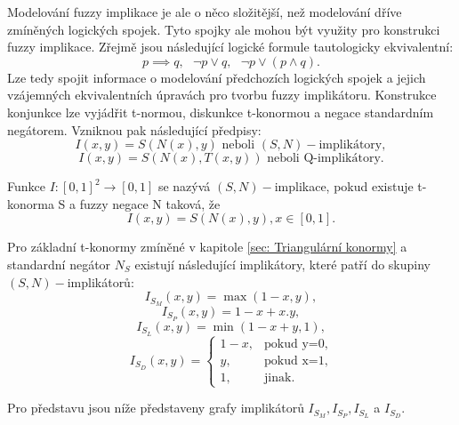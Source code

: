Modelov\'an\'i fuzzy implikace je ale o něco složitější, než modelov\'an\'i dříve zmíněných logických spojek. Tyto spojky ale mohou být využity pro konstrukci fuzzy implikace. Zřejmě jsou následující logické formule tautologicky ekvivalentní: $$ p\implies q, \mbox{   } \neg p \vee q, \mbox{   } \neg p\vee (p\wedge q) .$$ Lze tedy spojit informace o modelov\'an\'i p\v redchozích logických spojek a jejich vzájemných ekvivalentních \' upravách pro tvorbu fuzzy implikátoru. Konstrukce konjunkce lze vyjádřit t-normou, diskunkce t-konormou a negace standardn\'im negátorem. Vzniknou pak n\'asleduj\'ic\'i p\v redpisy:
$$I(x,y)=S(N(x),y)\text{ neboli $(S,N)-$implikátory},$$
$$I(x,y)=S(N(x),T(x,y)) \text{ neboli Q-implikátory}.$$

\begin{definition}
    \cite{Springer}
    Funkce $I: [0,1]^2 \rightarrow [0,1]$ se nazývá $(S,N)-$implikace, pokud existuje t-konorma S a fuzzy negace N taková, že $$I(x,y) = S(N(x),y), x \in [0,1].$$
\end{definition}

\begin{example}
\cite{Springer}
Pro základní t-konormy zmíněné v kapitole \ref{sec: Triangulární konormy} a standardní negátor $N_S$ existují následující implikátory, které patří do skupiny $(S,N)-$implikátor\r u:\\
    \vbox{$$ I_{S_M}(x,y)=\max(1-x,y),$$ }
\vbox{$$ I_{S_P}(x,y)=1-x+x.y,$$}
 \vbox{$$ I_{S_L}(x,y)=\min(1-x+y,1),$$}
 $$ I_{S_D}(x,y)=\begin{cases} 1-x,
&\mbox {pokud y=0,} \\y, &\mbox {pokud x=1}, \\
1, &\mbox {jinak.} \end{cases} $$
\end{example}

Pro představu jsou níže představeny grafy implikátorů $I_{S_M}, I_{S_P}, I_{S_L}$ a $I_{S_D}.$



